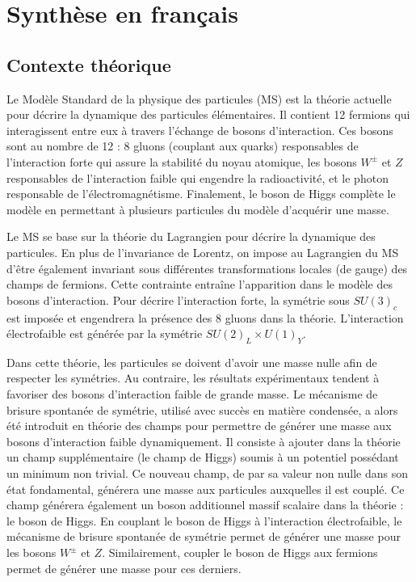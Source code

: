 \chapter{Synthèse en français}

\section{Contexte théorique}
Le Modèle Standard de la physique des particules (MS) est la théorie actuelle pour décrire la dynamique des particules élémentaires.
Il contient 12 fermions qui interagissent entre eux à travers l'échange de bosons d'interaction.
Ces bosons sont au nombre de 12 : 8 gluons (couplant aux quarks) responsables de l'interaction forte qui assure la stabilité du noyau atomique, les bosons $W^\pm$ et $Z$ responsables de l'interaction faible qui engendre la radioactivité, et le photon responsable de l'électromagnétisme.
Finalement, le boson de Higgs complète le modèle en permettant à plusieurs particules du modèle d'acquérir une masse.

Le MS se base sur la théorie du Lagrangien pour décrire la dynamique des particules.
En plus de l'invariance de Lorentz, on impose au Lagrangien du MS d'être également invariant sous différentes transformations locales (de gauge) des champs de fermions.
Cette contrainte entraîne l'apparition dans le modèle des bosons d'inte\-raction.
Pour décrire l'interaction forte, la symétrie sous $SU(3)_c$ est imposée et engendrera la présence des 8 gluons dans la théorie.
L'interaction électrofaible est générée par la symétrie $SU(2)_L\times U(1)_Y$.

Dans cette théorie, les particules se doivent d'avoir une masse nulle afin de respecter les symétries.
Au contraire, les résultats expérimentaux tendent à favoriser des bosons d'interaction faible de grande masse.
Le mécanisme de brisure spontanée de symétrie, utilisé avec succès en matière condensée, a alors été introduit en théorie des champs pour permettre de générer une masse aux bosons d'interaction faible dynamiquement.
Il consiste à ajouter dans la théorie un champ supplémentaire (le champ de Higgs) soumis à un potentiel possédant un minimum non trivial.
Ce nouveau champ, de par sa valeur non nulle dans son état fondamental, générera une masse aux particules auxquelles il est couplé.
Ce champ générera également un boson additionnel massif scalaire dans la théorie : le boson de Higgs.
En couplant le boson de Higgs à l'interaction électrofaible, le mécanisme de brisure spontanée de symétrie permet de générer une masse pour les bosons $W^\pm$ et $Z$.
Similairement, coupler le boson de Higgs aux fermions permet de générer une masse pour ces derniers.

